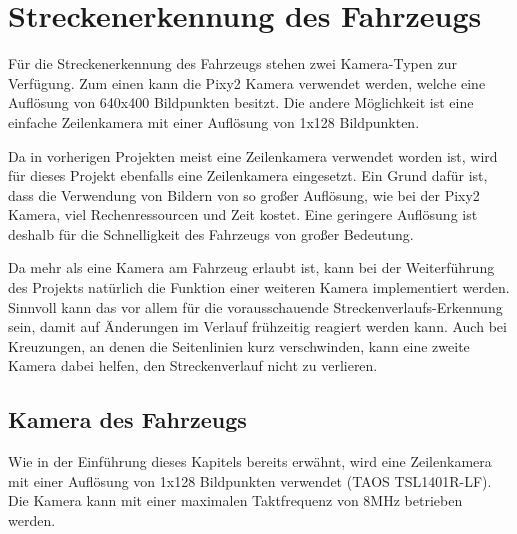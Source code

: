 

\pagestyle{fancy}
\rhead{\thepage} \chead{} 
\cfoot{}

\section{Streckenerkennung des Fahrzeugs}\label{Sec7}

Für die Streckenerkennung des Fahrzeugs stehen zwei Kamera-Typen zur Verfügung. Zum einen kann die Pixy2 Kamera verwendet werden, welche eine Auflösung von 640x400 Bildpunkten besitzt. Die andere Möglichkeit ist eine einfache Zeilenkamera mit einer Auflösung von 1x128 Bildpunkten.\vspace{11pt}

Da in vorherigen Projekten meist eine Zeilenkamera verwendet worden ist, wird für dieses Projekt ebenfalls eine Zeilenkamera eingesetzt. Ein Grund dafür ist, dass die Verwendung von Bildern von so großer Auflösung, wie bei der Pixy2 Kamera, viel Rechenressourcen und Zeit kostet. Eine geringere Auflösung ist deshalb für die Schnelligkeit des Fahrzeugs von großer Bedeutung. \vspace{11pt}

Da mehr als eine Kamera am Fahrzeug erlaubt ist, kann bei der Weiterführung des Projekts natürlich die Funktion einer weiteren Kamera implementiert werden. Sinnvoll kann das vor allem für die vorausschauende Streckenverlaufs-Erkennung sein, damit auf Änderungen im Verlauf frühzeitig reagiert werden kann. Auch bei Kreuzungen, an denen die Seitenlinien kurz verschwinden, kann eine zweite Kamera dabei helfen, den Streckenverlauf nicht zu verlieren.

\subsection{Kamera des Fahrzeugs}\label{Sec7Sub1}

Wie in der Einführung dieses Kapitels bereits erwähnt, wird eine Zeilenkamera mit einer Auflösung von 1x128 Bildpunkten verwendet (TAOS TSL1401R-LF). Die Kamera kann mit einer maximalen Taktfrequenz von 8MHz betrieben werden.

